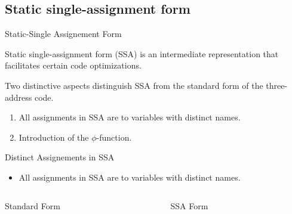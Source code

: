 \begin{bibunit}[apalike]
\subsection{Static single-assignment form}

\tableofcontentslide[sections={1-5},sectionstyle={show/shaded},subsectionstyle={show/shaded/hide},subsubsectionstyle={show/show/hide/hide}]

\begin{frame}{Static-Single Assignement Form}
	\begin{definition}
		Static single-assignment form (SSA) is an intermediate representation that facilitates certain code optimizations.
	\end{definition}
	\vspace{3em}
	Two distinctive aspects distinguish SSA from the standard form of the three-address code.
	\begin{enumerate}
	\item All assignments in SSA are to variables with distinct names.
	\item Introduction of the $\phi$-function.
	\end{enumerate}
\end{frame}

\begin{frame}{Distinct Assignements in SSA}
	\begin{itemize}
	\item All assignments in SSA are to variables with distinct names.
	\end{itemize}
	\vspace{2em}
	\begin{columns}
		\begin{column}{.5\linewidth}
			\begin{center}
			\begin{tac}[\linewidth]
			\end{tac}
			\vspace{1em}
			Standard Form
			\end{center}
		\end{column}
		\begin{column}{.5\linewidth}
			\begin{center}
			\begin{tac}[\linewidth]
			\end{tac}
			\vspace{1em}
			SSA Form
			\end{center}
		\end{column}
	\end{columns}
\end{frame}


\end{bibunit}
